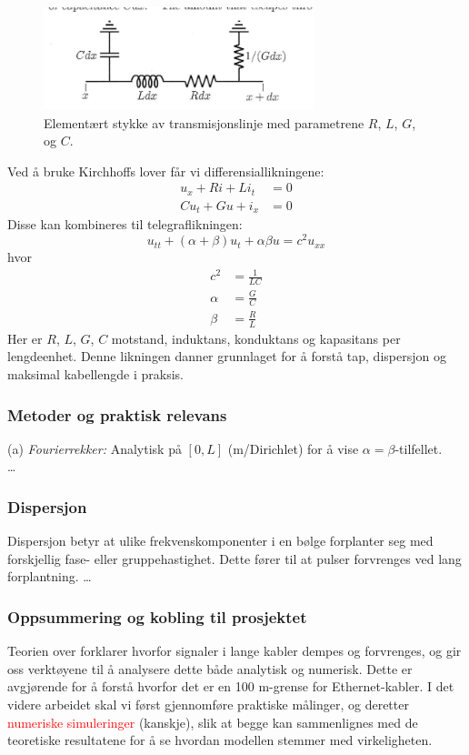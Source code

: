 \begin{figure}[h]
    \centering
    \includegraphics[width=0.7\textwidth]{Media/telegraflinje.png}
    \caption{Elementært stykke av transmisjonslinje med parametrene $R$, $L$, $G$, og $C$.}
    \label{fig:telegraflinje}
\end{figure}

\noindent Ved å bruke Kirchhoffs lover får vi differensiallikningene:
\begin{align}
u_x + R i + L i_t &= 0 \\
C u_t + G u + i_x &= 0
\end{align}
Disse kan kombineres til telegraflikningen:
\begin{equation}
u_{tt} + (\alpha + \beta) u_t + \alpha \beta u = c^2 u_{xx}
\end{equation}
hvor
\begin{align*}
c^2 &= \frac{1}{LC} \\
\alpha &= \frac{G}{C} \\
\beta &= \frac{R}{L}
\end{align*}
Her er $R$, $L$, $G$, $C$ motstand, induktans, konduktans og kapasitans per lengdeenhet. Denne likningen danner grunnlaget for å forstå tap, dispersjon og maksimal kabellengde i praksis.

\subsubsection{Metoder og praktisk relevans}

(a) \textit{Fourierrekker:} Analytisk på $[0,L]$ (m/Dirichlet) for å vise $\alpha=\beta$-tilfellet.\\
\dots
\clearpage
\subsubsection{Dispersjon}

Dispersjon betyr at ulike frekvenskomponenter i en bølge forplanter seg med forskjellig fase- eller gruppehastighet. Dette fører til at pulser forvrenges ved lang forplantning. 
\dots

\subsubsection{Oppsummering og kobling til prosjektet}

Teorien over forklarer hvorfor signaler i lange kabler dempes og forvrenges, og gir oss verktøyene til å analysere dette både analytisk og numerisk. Dette er avgjørende for å forstå hvorfor det er en 100 m-grense for Ethernet-kabler. I det videre arbeidet skal vi først gjennomføre praktiske målinger, og deretter \textcolor{red}{numeriske simuleringer} (kanskje), slik at begge kan sammenlignes med de teoretiske resultatene for å se hvordan modellen stemmer med virkeligheten.

